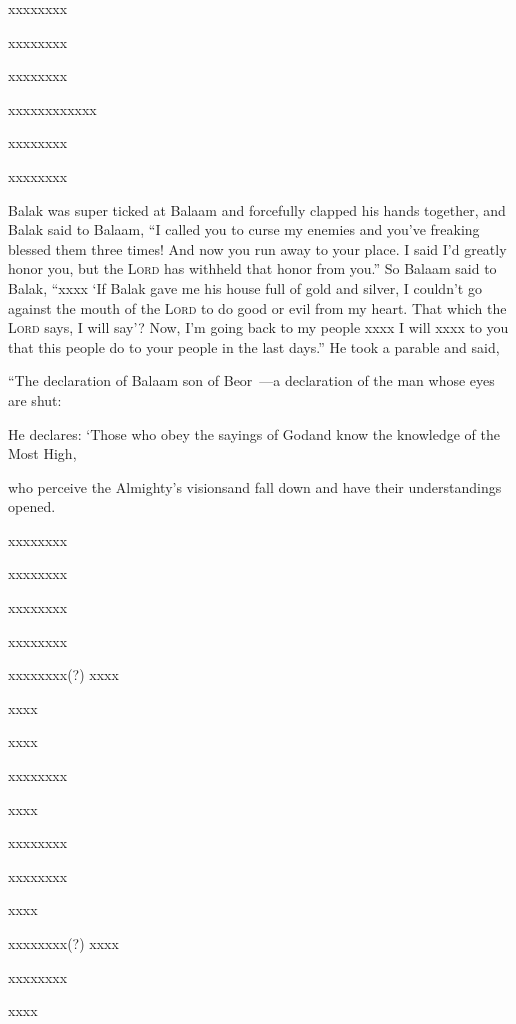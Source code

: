 \begin{inparaenum}
  \pb {} xxxx\pa xxxx%
  
  \pb xxxx\pa xxxx%
  
  \pa {} xxxx\pa xxxx%
  
  \pc xxxx\pa xxxx\pa xxxx%
  
  \pa {} xxxx\pa xxxx%
  
  \pb xxxx\pa xxxx%
  
   Balak was super ticked at Balaam and forcefully clapped his hands together, and Balak said to Balaam, ``I called you to curse my enemies and you've freaking blessed them three times!%
   And now you run away to your place. I said I'd greatly honor you, but the \textsc{Lord} has withheld that honor from you.''%
   So Balaam said to Balak, ``xxxx%
   `If Balak gave me his house full of gold and silver, I couldn't go against the mouth of the \textsc{Lord} to do good or evil from my heart. That which the \textsc{Lord} says, I will say'?%
   Now, I'm going back to my people xxxx I will xxxx to you that this people do to your people in the last days.''%
   He took a parable and said,%
  
  \pb ``The declaration of Balaam son of Beor~---\pa a declaration of the man whose eyes are shut:%
  
  \pa {} He declares:%
  `Those who obey the sayings of God\pa and know the knowledge of the Most High,%
  
  \pb who perceive the Almighty's visions\pa and fall down and have their understandings opened.%
  
  \pb {} xxxx\pa xxxx%
  
  \pb xxxx\pa xxxx%
  
  \pb xxxx\pa xxxx%
  
  \pb {} xxxx\pa xxxx%
  
  \pb xxxx\pa xxxx(?)  xxxx%
  
  \pb xxxx%
  
   xxxx%
  
  \pb xxxx\pa xxxx%
  
   xxxx%
  
  \pb xxxx\pa xxxx%
  
  \pa {} xxxx\pa xxxx%
  
   xxxx%
  
  \pb xxxx\pa xxxx(?)  xxxx%
  
  \pb xxxx\pa xxxx%
  
   xxxx%
\end{inparaenum}
